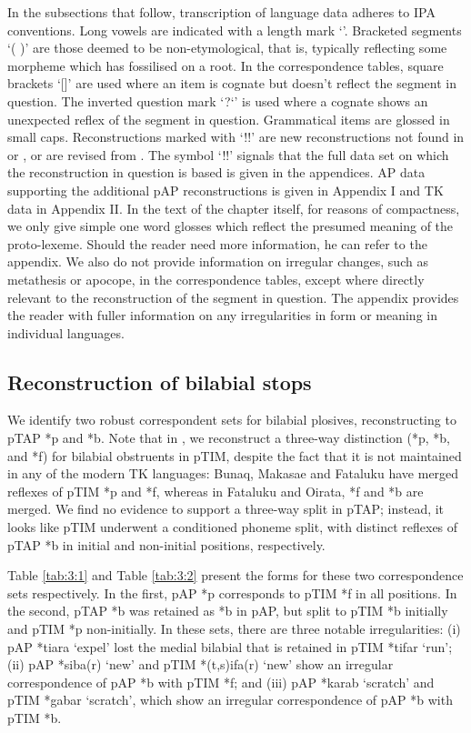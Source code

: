 In the subsections that follow, transcription of language data adheres to IPA conventions. Long vowels are indicated with a length mark `{\textlengthmark}'. Bracketed segments `( )' are those deemed to be non-etymological, that is, typically reflecting some morpheme which has fossilised on a root. In the correspondence tables, square brackets `[]' are used where an item is cognate but doesn't reflect the segment in question. The inverted question mark `?`' is used where a cognate shows an unexpected reflex of the segment in question. Grammatical items are glossed in small caps. Reconstructions marked with `!!' are new reconstructions not found in \citet{HoltonEtAl2012} or \citet{SchapperEtAl2012}, or are revised from \citet{HoltonEtAl2012}. The symbol `!!' signals that the full data set on which the reconstruction in question is based is given in the appendices. AP data supporting the additional pAP reconstructions is given in Appendix I and TK data in Appendix II. In the text of the chapter itself, for reasons of compactness, we only give simple one word glosses which reflect the presumed meaning of the proto-lexeme. Should the reader need more information, he can refer to the appendix. We also do not provide information on irregular changes, such as metathesis or apocope, in the correspondence tables, except where directly relevant to the reconstruction of the segment in question. The appendix provides the reader with fuller information on any irregularities in form or meaning in individual languages. 

\subsection{Reconstruction of bilabial stops}
We identify two robust correspondent sets for bilabial plosives, reconstructing to pTAP *p and *b. Note that in \citet{SchapperEtAl2012}, we reconstruct a three-way distinction (*p, *b, and *f) for bilabial obstruents in pTIM, despite the fact that it is not maintained in any of the modern TK languages: Bunaq, Makasae and Fataluku have merged reflexes of pTIM *p and *f, whereas in Fataluku and Oirata, *f and *b are merged. We find no evidence to support a three-way split in pTAP; instead, it looks like pTIM underwent a conditioned phoneme split, with distinct reflexes of pTAP *b in initial and non-initial positions, respectively. 

Table \ref{tab:3:1} and Table \ref{tab:3:2} present the forms for these two correspondence sets respectively. In the first, pAP *p corresponds to pTIM *f in all positions. In the second, pTAP *b was retained as *b in pAP, but split to pTIM *b initially and pTIM *p non-initially. In these sets, there are three notable irregularities: (i) pAP *tiara `expel' lost the medial bilabial that is retained in pTIM *tifar `run'; (ii) pAP *siba(r) `new' and pTIM *(t,s)ifa(r) `new' show an irregular correspondence of pAP *b with pTIM *f; and (iii) pAP *karab `scratch' and pTIM *gabar `scratch', which show an irregular correspondence of pAP *b with pTIM *b. 
 


